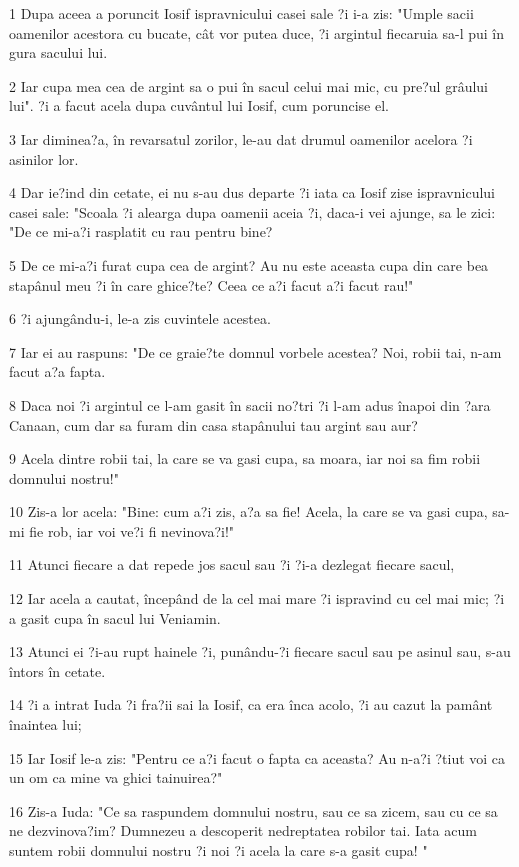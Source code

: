 \par 1 Dupa aceea a poruncit Iosif ispravnicului casei sale ?i i-a zis: "Umple sacii oamenilor acestora cu bucate, cât vor putea duce, ?i argintul fiecaruia sa-l pui în gura sacului lui.
\par 2 Iar cupa mea cea de argint sa o pui în sacul celui mai mic, cu pre?ul grâului lui". ?i a facut acela dupa cuvântul lui Iosif, cum poruncise el.
\par 3 Iar diminea?a, în revarsatul zorilor, le-au dat drumul oamenilor acelora ?i asinilor lor.
\par 4 Dar ie?ind din cetate, ei nu s-au dus departe ?i iata ca Iosif zise ispravnicului casei sale: "Scoala ?i alearga dupa oamenii aceia ?i, daca-i vei ajunge, sa le zici: "De ce mi-a?i rasplatit cu rau pentru bine?
\par 5 De ce mi-a?i furat cupa cea de argint? Au nu este aceasta cupa din care bea stapânul meu ?i în care ghice?te? Ceea ce a?i facut a?i facut rau!"
\par 6 ?i ajungându-i, le-a zis cuvintele acestea.
\par 7 Iar ei au raspuns: "De ce graie?te domnul vorbele acestea? Noi, robii tai, n-am facut a?a fapta.
\par 8 Daca noi ?i argintul ce l-am gasit în sacii no?tri ?i l-am adus înapoi din ?ara Canaan, cum dar sa furam din casa stapânului tau argint sau aur?
\par 9 Acela dintre robii tai, la care se va gasi cupa, sa moara, iar noi sa fim robii domnului nostru!"
\par 10 Zis-a lor acela: "Bine: cum a?i zis, a?a sa fie! Acela, la care se va gasi cupa, sa-mi fie rob, iar voi ve?i fi nevinova?i!"
\par 11 Atunci fiecare a dat repede jos sacul sau ?i ?i-a dezlegat fiecare sacul,
\par 12 Iar acela a cautat, începând de la cel mai mare ?i ispravind cu cel mai mic; ?i a gasit cupa în sacul lui Veniamin.
\par 13 Atunci ei ?i-au rupt hainele ?i, punându-?i fiecare sacul sau pe asinul sau, s-au întors în cetate.
\par 14 ?i a intrat Iuda ?i fra?ii sai la Iosif, ca era înca acolo, ?i au cazut la pamânt înaintea lui;
\par 15 Iar Iosif le-a zis: "Pentru ce a?i facut o fapta ca aceasta? Au n-a?i ?tiut voi ca un om ca mine va ghici tainuirea?"
\par 16 Zis-a Iuda: "Ce sa raspundem domnului nostru, sau ce sa zicem, sau cu ce sa ne dezvinova?im? Dumnezeu a descoperit nedreptatea robilor tai. Iata acum suntem robii domnului nostru ?i noi ?i acela la care s-a gasit cupa! "
